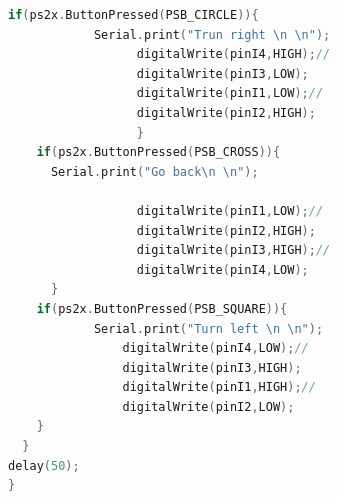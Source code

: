 \documentclass{article}
\begin{document}
\begin{lstlisting}[language={C}]
    if(ps2x.ButtonPressed(PSB_CIRCLE)){              
            Serial.print("Trun right \n \n");
                  digitalWrite(pinI4,HIGH);//
                  digitalWrite(pinI3,LOW);
                  digitalWrite(pinI1,LOW);//
                  digitalWrite(pinI2,HIGH);
                  }
    if(ps2x.ButtonPressed(PSB_CROSS)){              
      Serial.print("Go back\n \n");
      
                  digitalWrite(pinI1,LOW);//
                  digitalWrite(pinI2,HIGH);
                  digitalWrite(pinI3,HIGH);//
                  digitalWrite(pinI4,LOW);
      }
    if(ps2x.ButtonPressed(PSB_SQUARE)){              
            Serial.print("Turn left \n \n");
                digitalWrite(pinI4,LOW);//
                digitalWrite(pinI3,HIGH);
                digitalWrite(pinI1,HIGH);//
                digitalWrite(pinI2,LOW);
    }     
  }
delay(50);
}

\end{lstlisting}
\end{document}
